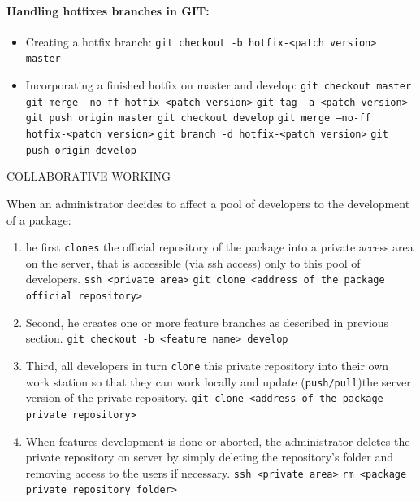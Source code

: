 \documentclass[12pt,a4paper]{article}
\begin{document}
\paragraph{Handling hotfixes branches in GIT:}
\begin{itemize}
\item Creating a hotfix branch:
\linebreak \texttt{git checkout -b hotfix-<patch version> master}
\item Incorporating a finished hotfix on master and develop:
\linebreak \texttt{git checkout master}
\linebreak \texttt{git merge --no-ff hotfix-<patch version>}
\linebreak \texttt{git tag -a <patch version>}
\linebreak \texttt{git push origin master}
\linebreak \texttt{git checkout develop}
\linebreak \texttt{git merge --no-ff hotfix-<patch version>}
\linebreak \texttt{git branch -d  hotfix-<patch version>}
\linebreak \texttt{git push origin develop}
\end{itemize}


COLLABORATIVE WORKING

When an administrator decides to affect a pool of developers to the development of a package:
\begin{enumerate}
\item he first \texttt{clones} the official repository of the package into a private access area on the server, that is accessible (via ssh access) only to this pool of developers. 
\linebreak \texttt{ssh <private area>}
\linebreak \texttt{git clone <address of the package official repository>}
\item Second, he creates one or more feature branches as described in previous section.
\linebreak \texttt{git checkout -b <feature name> develop}
\item Third, all developers in turn \texttt{clone} this private repository into their own work station so that they can work locally and update (\texttt{push/pull})the server version of the private repository.
\linebreak \texttt{git clone <address of the package private repository>}
\item When features development is done or aborted, the administrator deletes 
the private repository on server by simply deleting the repository's folder and removing access to the users if necessary.
\linebreak \texttt{ssh <private area>}
\linebreak \texttt{rm <package private repository folder>}
\end{enumerate}
 
\end{document}
